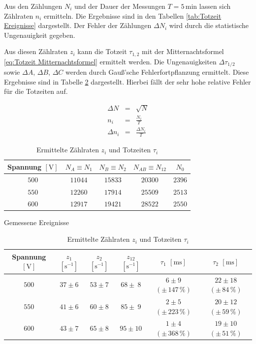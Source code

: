 \documentclass[12pt,a4paper]{scrartcl}
\numberwithin{equation}{section} %
\begin{document}
Aus den Zählungen $N_i$ und der Dauer der Messungen $T=5\mathrm{\,min}$ lassen sich Zählraten $n_i$ ermitteln. Die Ergebnisse sind in den Tabellen \ref{tab:Totzeit Ereignisse} dargestellt. Der Fehler der Zählungen $\Delta N_i$ wird durch die statistische Ungenauigkeit gegeben.

Aus diesen Zählraten $z_i$ kann die Totzeit $\tau_{1,2}$ mit der Mitternachtsformel \eqref{eq:Totzeit Mitternachtsformel} ermittelt werden. Die Ungenauigkeiten  $\Delta \tau_{1/2}$ sowie $\Delta A$, $\Delta B$, $\Delta C$ werden durch Gauß'sche Fehlerfortpflanzung ermittelt. Diese Ergebnisse sind in Tabelle \ref{tab:Totzeiten} dargestellt. Hierbei fällt der sehr hohe relative Fehler für die Totzeiten auf.

\begin{eqnarray}
	\Delta N &=& \sqrt{N} \\
	n_i &=& \frac{N_i}{T} \\
	\Delta n_i &=& \frac{\Delta N_i}{T}
\end{eqnarray}

\begin{table}[h!]
	\centering
	\begin{tabular}[h]{c|c|c|c|c}
		Spannung $[\mathrm V]$
			& $N_A\equiv N_1$
			& $N_B\equiv N_2$
			& $N_{AB}\equiv N_{12}$
			& $N_0$ \\
		\hline
		$500$ & $11044$ & $15833$ & $20300$ & $2396$ \\
		$550$ & $12260$ & $17914$ & $25509$ & $2513$ \\
		$600$ & $12917$ & $19421$ & $28522$ & $2550$ \\
	\end{tabular}
	\caption{Gemessene Ereignisse}
	\label{tab:Totzeit Ereignisse}
	\vspace{12pt}

	\begin{tabular}[h]{c|c|c|c|c|c}
		Spannung $[\mathrm V]$
			& $z_1$ $[\mathrm s^{-1}]$
			& $z_2$ $[\mathrm s^{-1}]$
			& $z_{12}$ $[\mathrm s^{-1}]$
			& $\tau_1$ $[\mathrm{ms}]$
			& $\tau_2$ $[\mathrm{ms}]$ \\
		\hline
		$500$
			& $37 \pm 6$
			& $53 \pm 7$
			& $68 \pm \ 8$
			& $6 \pm 9$ $(\pm\, 147\,\%)$
			& $22 \pm 18$ $(\pm\, 84\,\%)$ \\
		$550$
			& $41 \pm 6$
			& $60 \pm 8$
			& $85 \pm \ 9$
			 & $2 \pm 5$ $(\pm\, 223\,\%)$
			 & $20 \pm 12$ $(\pm\, 59\,\%)$ \\
		$600$
			& $43 \pm 7$
			& $65 \pm 8$
			& $95 \pm 10$
			& $1 \pm 4$ $(\pm\, 368\,\%)$
			& $19 \pm 10$ $(\pm\, 51\,\%)$ \\
	\end{tabular}
	\caption{Ermittelte Zählraten $z_i$ und Totzeiten $\tau_i$}
	\label{tab:Totzeiten}
\end{table}
\end{document}
